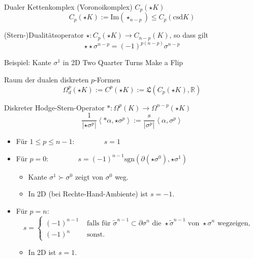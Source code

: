 \documentclass{beamer}
\newcommand{\R}{\mathds{R}}
\newcommand{\qqquad}{\qquad\qquad}
\begin{document}
  \begin{frame}
    \begin{block}{Dualer Kettenkomplex (Voronoikomplex) \( C_{p}(\star K) \)}
      \[ C_{p}(\star K) := \text{Im}(\star_{n-p}) \le C_{p}(\text{csd}K) \]
    \end{block}
    \begin{block}{(Stern-)Dualitätsoperator \( \star: C_{p}(\star K) \longrightarrow C_{n-p}(K)\), so dass gilt}
      \[ \star\star \sigma^{n-p} = (-1)^{p(n-p)}\sigma^{n-p}\]
    \end{block}
    \begin{block}{Beispiel: Kante \( \sigma^{1} \) in 2D}
      \glqq Two Quarter Turns Make a Flip \grqq
    \end{block}
    \begin{block}{Raum der dualen diskreten \( p \)-Formen }
      \[ \Omega^{p}_{d}(\star K) := C^{p}(\star K) := \mathfrak{L}(C_{p}(\star K), \R) \]
    \end{block}
  \end{frame}

  \begin{frame}
    \begin{block}{Diskreter Hodge-Stern-Operator \( *: \Omega^{p}(K) \longrightarrow \Omega^{n-p}(\star K)\)}
      \[ \frac{1}{|\star\sigma^{p}|} \left\langle *\alpha , \star\sigma^{p} \right\rangle := \frac{s}{|\sigma^{p}|} \left\langle \alpha , \sigma^{p} \right\rangle\]
      \begin{itemize}
        \item Für \( 1 \le p \le n-1: \qqquad s = 1 \)
        \item Für \( p = 0: \qqquad s = (-1)^{n-1} \text{sgn} \left( \partial(\star\sigma^{0}), \star\sigma^{1} \right) \)
              \begin{itemize}
                \item Kante \( \sigma^{1} \succ \sigma^{0} \) zeigt von \( \sigma^{0} \) weg.
                \item In 2D (bei Rechte-Hand-Ambiente) ist \( s = -1 \).
              \end{itemize}
              \item Für \( p = n:\)      
     \[s = \begin{cases} (-1)^{n-1} & \text{ falls für } \tilde{\sigma}^{n-1} \subset \partial \sigma^{n} \text { die } \star\tilde{\sigma}^{n-1} \text{ von } \star\sigma^{n} \text{ wegzeigen,} \\
                         (-1)^{n} & \text{ sonst.}
           \end{cases}\]
                \begin{itemize}
                  \item In 2D ist \( s = 1 \).
                \end{itemize}
      \end{itemize}
    \end{block}
  \end{frame}
\end{document}
